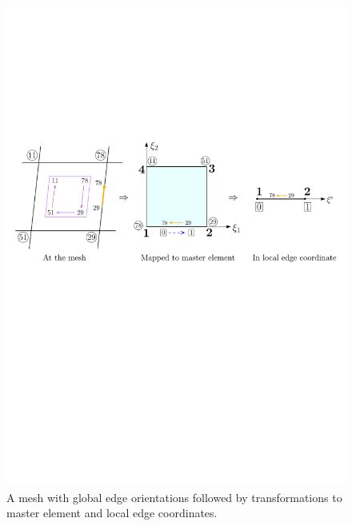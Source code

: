 \begin{figure}[!ht]
\begin{center}
\includegraphics[scale=0.75]{./figures/QuadEdgeOrientExample.pdf}
\caption{A mesh with global edge orientations followed by transformations to master element and local edge coordinates.}
\label{fig:QuadEdgeOrientExample}
\end{center}
\end{figure}

